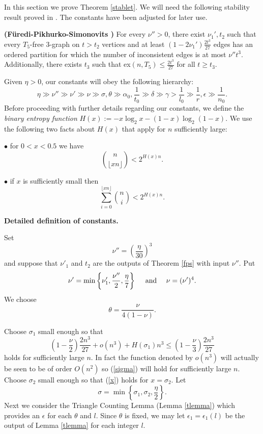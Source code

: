 \documentclass[11pt]{article}
\begin{document}
In this section we prove Theorem \ref{stablet}.
We will need the following stability result proved in \cite{FPS}.
The constants have been adjusted for later use.

\begin{theorem} {\bf (F\"uredi-Pikhurko-Simonovits \cite{FPS})} \label{fps}
For every $\nu''>0$, there exist $\nu_1', t_2$ such that every
$T_5$-free $3$-graph on $t>t_2$ vertices and at least
$(1-2\nu_1')\frac{2t^3}{27}$ edges has an ordered partition for
which the number of inconsistent edges is at most $\nu'' t^3$.
Additionally, there exists $t_3$ such that ex$(n, T_5)\le
\frac{2t^3}{27}$ for all $t \ge t_3$.
\end{theorem}


Given $\eta>0$, our constants will obey the following hierarchy:
$$\eta\gg \nu''\gg \nu' \gg \nu \gg \sigma, \theta
\gg  \alpha_0, \frac{1}{t_0} \gg \delta \gg \gamma >\frac{1}{l_0} \gg\frac{1}{r}, \epsilon \gg \frac{1}{n_0}.$$
Before proceeding with further details regarding our constants,
we define the {\it binary entropy function} $H(x):=
-x\log_2 x- (1-x)\log_2 (1-x).$  We use the following two  facts about $H(x)$ that apply for $n$ sufficiently large:

$\bullet$ for $0<x< 0.5$ we
have $$\binom{n}{\lfloor xn\rfloor}<2^{H(x)n}.$$

$\bullet$  if $x$ is sufficiently small
then
\begin{equation} \label{x} \sum_{i=0}^{\lfloor xn\rfloor} \binom{n}{i}<2^{H(x)n}.\end{equation}


{\bf Detailed definition of constants.}

Set
\begin{equation} \label{nu''def}\nu''=\left(\frac{\eta}{30}\right)^3\end{equation}
 and suppose that $\nu'_1$ and $t_2$ are the outputs of Theorem \ref{fps} with input $\nu''$.  Put
\begin{equation} \label{nu'}
\nu'=\min\left\{\nu'_1, \frac{\nu''}{2}, \frac{\eta}{7}\right\} \quad \hbox{ and } \quad \nu=(\nu')^4.\end{equation}
We choose
  \begin{equation} \label{theta}
  \theta=\frac{\nu}{4(1-\nu)}.\end{equation}

Choose $\sigma_1$ small enough  so that
\begin{equation} \label{sigma}
\left(1-\frac{\nu}{2}\right)\frac{2n^3}{27}+o(n^3)+H(\sigma_1)n^3\le
\left(1-\frac{\nu}{3}\right)\frac{2n^3}{27}\end{equation} holds for
sufficiently large $n$.  In fact the function denoted by $o(n^3)$
will actually be seen to be of order $O(n^2)$ so (\ref{sigma}) will
hold for sufficiently large $n$. Choose $\sigma_2$ small enough so
that (\ref{x}) holds for $x=\sigma_2$. Let
$$\sigma=\min\left\{\sigma_1, \sigma_2, \frac{\eta}{2}\right\}.$$
Next we consider the Triangle Counting Lemma (Lemma \ref{tlemma}) which provides an
$\epsilon$ for each  $\theta$ and $l$. Since $\theta$ is fixed, we may let
$\epsilon_1=\epsilon_1(l)$ be the output of Lemma \ref{tlemma} for each integer $l$.
\end{document}
